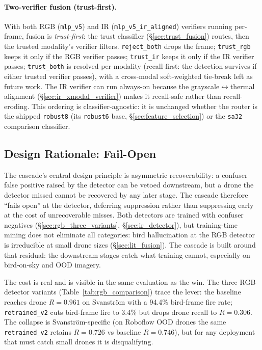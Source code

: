 \paragraph{Two-verifier fusion (trust-first).} With both RGB (\texttt{mlp\_v5}) and IR (\texttt{mlp\_v5\_ir\_aligned}) verifiers running per-frame, fusion is \emph{trust-first}: the trust classifier (\S\ref{sec:trust_fusion}) routes, then the trusted modality's verifier filters. \texttt{reject\_both} drops the frame; \texttt{trust\_rgb} keeps it only if the RGB verifier passes; \texttt{trust\_ir} keeps it only if the IR verifier passes; \texttt{trust\_both} is resolved per-modality (recall-first: the detection survives if either trusted verifier passes), with a cross-modal soft-weighted tie-break left as future work. The IR verifier can run always-on because the grayscale$\leftrightarrow$thermal alignment (\S\ref{sec:ir_xmodal_verifier}) makes it recall-safe rather than recall-eroding. This ordering is classifier-agnostic: it is unchanged whether the router is the shipped \texttt{robust8} (its \texttt{robust6} base, \S\ref{sec:feature_selection}) or the \texttt{sa32} comparison classifier.

\subsection{Design Rationale: Fail-Open}
\label{sec:design_rationale}

The cascade's central design principle is asymmetric recoverability: a confuser false positive raised by the detector can be vetoed downstream, but a drone the detector missed cannot be recovered by any later stage. The cascade therefore ``fails open'' at the detector, deferring suppression rather than suppressing early at the cost of unrecoverable misses. Both detectors are trained with confuser negatives (\S\ref{sec:rgb_three_variants}, \S\ref{sec:ir_detector}), but training-time mining does not eliminate all categories: bird hallucination at the RGB detector is irreducible at small drone sizes (\S\ref{sec:lit_fusion}). The cascade is built around that residual: the downstream stages catch what training cannot, especially on bird-on-sky and OOD imagery.

The cost is real and is visible in the same evaluation as the win. The three RGB-detector variants (Table~\ref{tab:rgb_comparison}) trace the lever: the baseline reaches drone $R=0.961$ on Svanstr\"om with a 94.4\% bird-frame fire rate; \texttt{retrained\_v2} cuts bird-frame fire to 3.4\% but drops drone recall to $R=0.306$. The collapse is Svanstr\"om-specific (on Roboflow OOD drones the same \texttt{retrained\_v2} retains $R=0.726$ vs baseline $R=0.746$), but for any deployment that must catch small drones it is disqualifying.

